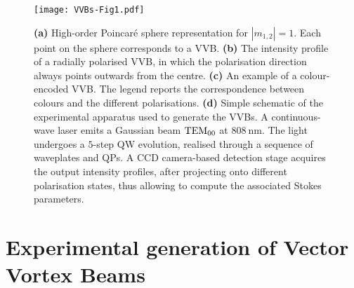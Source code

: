 \begin{figure}[tb]
	\centering
   \texttt{[image: VVBs-Fig1.pdf]}
    \caption{
    	\textbf{(a)} High-order Poincar\'e sphere representation for $|m_{1,2}|=1$. Each point on the sphere corresponds to a VVB. 
	    \textbf{(b)} The intensity profile of a radially polarised \ac{VVB}, in which the polarisation direction always points outwards from the centre.
	    \textbf{(c)} An example of a colour-encoded VVB.
	    The legend reports the correspondence between colours and the different polarisations.
	    \textbf{(d)} Simple schematic of the experimental apparatus used to generate the \acp{VVB}. A continuous-wave laser emits a Gaussian beam $\operatorname{TEM}_{00}$ at $\SI{808}{\nm}$. The light undergoes a $5$-step QW evolution, realised through a sequence of waveplates and QPs.
    	A CCD camera-based detection stage acquires the output intensity profiles, after projecting onto different polarisation states, thus allowing to compute the associated Stokes parameters.
    }%
    \label{fig:VVBs:poinc_sphere}
\end{figure}


\section{Experimental generation of Vector Vortex Beams}

